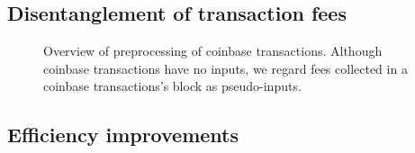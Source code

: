 \subsection{Disentanglement of  transaction fees}
\label{sec:improve_fees}%
\begin{figure}[t]
	
	\centering
	\caption{Overview of preprocessing of coinbase transactions. Although coinbase transactions have no inputs, we regard fees collected in a coinbase transactions's block as pseudo-inputs.}
\end{figure}



\subsection{Efficiency improvements}
\label{sec:novel_impl}%

